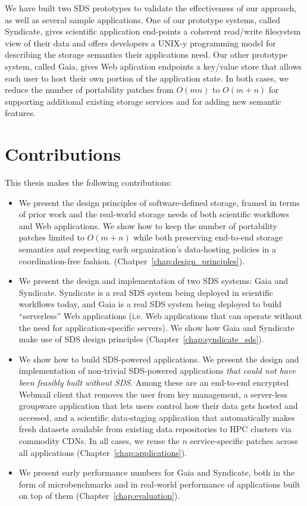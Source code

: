 We have built two SDS prototypes to validate the effectiveness of our approach,
as well as several sample applications.  One of our prototype
systems, called Syndicate, gives scientific application end-points a coherent read/write
filesystem view of their data and offers developers a UNIX-y programming model
for describing the storage semantics their applications need.  Our other
prototype system, called Gaia, gives Web aplication endpoints a key/value store
that allows each user to host their own portion of the application state.
In both cases, we reduce the number of portability patches from $O(mn)$ to $O(m + n)$
for supporting additional existing storage services and for adding new semantic
features.

\section{Contributions}

This thesis makes the following contributions:

\begin{itemize}

\item We present the design principles of software-defined storage, framed in
terms of prior work and the real-world storage needs of both scientific
workflows and Web applications.  We show how to
keep the number of portability patches limited to $O(m + n)$ while
both preserving end-to-end storage semantics and
respecting each organization's data-hosting policies in a coordination-free
fashion. (Chatper~\ref{chap:design_principles}).

\item We present the design and implementation of two SDS systems: Gaia and
Syndicate.  Syndicate is a real SDS system being deployed in scientific
workflows today, and Gaia is a real SDS system being deployed to build
``serverless'' Web applications (i.e. Web applications that can operate
without the need for application-specific servers).
We show how Gaia and Syndicate make use of SDS design principles
(Chapter~\ref{chap:syndicate_sds}).

\item We show how to build SDS-powered applications.  We present the design and
implementation of non-trivial SDS-powered applications \emph{that could not
have been feasibly built without SDS}.  Among these are an end-to-end encrypted
Webmail client that removes the user from key management, a server-less
groupware application that lets users control how their data gets hosted and
accessed, and a scientific data-staging application that
automatically makes fresh datasets available from existing data repositories to
HPC clusters via commodity CDNs.  In all cases, we reuse the $n$
service-specific patches across all applications
(Chapter~\ref{chap:applications}).

\item We present early performance numbers for Gaia and Syndicate, both in the
form of microbenchmarks and in real-world performance of applications built on
top of them (Chapter~\ref{chap:evaluation}).

\end{itemize}

